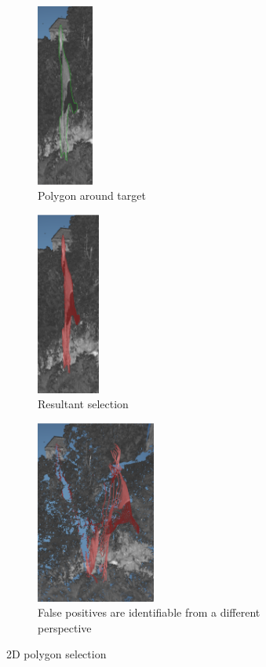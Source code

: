 \begin{figure}
\centering
\begin{subfigure}{.3\textwidth}
  \centering
  \includegraphics[height=6cm]{images/2dselect/1.png}
  \caption{Polygon around target}
\end{subfigure}%
\begin{subfigure}{.3\textwidth}
  \centering
  \includegraphics[height=6cm]{images/2dselect/2.png}
  \caption{Resultant selection}
\end{subfigure}
\begin{subfigure}{.3\textwidth}
  \centering
  \includegraphics[height=6cm]{images/2dselect/3.png}
  \caption{False positives are identifiable from a different perspective}
\end{subfigure}
\caption{2D polygon selection}\label{fig:2dselect}
\end{figure}


